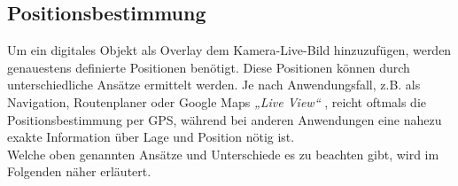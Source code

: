 \subsection{Positionsbestimmung}
\label{sec:posi}
Um ein digitales Objekt als Overlay dem Kamera-Live-Bild hinzuzufügen, werden genauestens definierte Positionen benötigt. Diese Positionen 
können durch unterschiedliche Ansätze ermittelt werden. Je nach Anwendungsfall, z.B. als Navigation, Routenplaner oder Google Maps 
\textit{„Live View“} \cite{googleliveview.2019a}, reicht oftmals die Positionsbestimmung per \acs{GPS}, während bei anderen Anwendungen eine 
nahezu exakte Information über Lage und Position nötig ist. %
\\ 
Welche oben genannten Ansätze und Unterschiede es zu beachten gibt, wird im Folgenden näher erläutert. %
